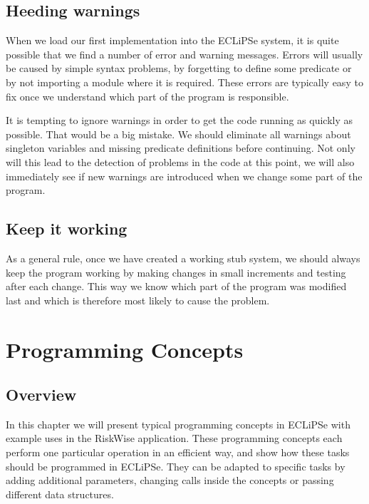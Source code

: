 \documentclass[a4paper,12pt]{report}
\begin{document}
\section{Heeding warnings}
When we load our first implementation into the ECLiPSe system, it is quite possible that we find a number of error and warning messages. Errors will usually be caused by simple syntax problems, by forgetting to define some predicate or by not importing a module where it is required. These errors are typically easy to fix once we understand which part of the program is responsible.

It is tempting to ignore warnings in order to get the code running as quickly as possible. That would be a big mistake. We should eliminate all warnings about singleton variables and missing predicate definitions before continuing. Not only will this lead to the detection of problems in the code at this point, we will also immediately see if new warnings are introduced when we change some part of the program. 

\section{Keep it working}
As a general rule, once we have created a working stub system, we should always keep the program working by making changes in small increments and testing after each change. This way we know which part of the program was modified last and which is therefore most likely to cause the problem. 


\chapter{Programming Concepts}
\label{programmingconcepts}

\section{Overview}
In this chapter we will present typical programming concepts in ECLiPSe with example 
uses in the RiskWise application. These programming concepts each perform one 
particular operation in an efficient way, and show how these tasks should be 
programmed in ECLiPSe. They can be adapted to specific tasks by adding 
additional parameters, changing calls inside the concepts or passing different 
data structures. 
\end{document}
